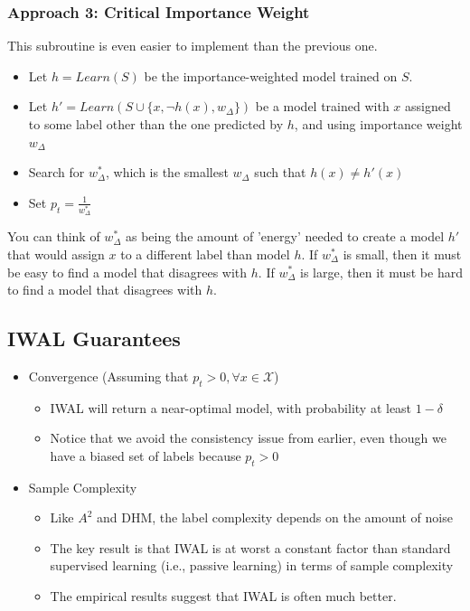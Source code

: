 \documentclass[10pt]{article}
\begin{document}
\subsubsection*{Approach 3: Critical Importance Weight}
This subroutine is even easier to implement than the previous one.
\begin{itemize}
	\item Let $h = Learn(S)$ be the importance-weighted model trained on $S$.
	\item Let $h' = Learn(S \cup \{x, \neg h(x), w_\Delta\})$ be a model trained with $x$ assigned to some label other than the one predicted by $h$, and using importance weight $w_{\Delta}$
	\item Search for $w_\Delta^*$, which is the smallest $w_\Delta$ such that $h(x) \neq h'(x)$
	\item Set $p_t = \frac{1}{w_\Delta^*}$
\end{itemize}
You can think of $w_\Delta^*$ as being the amount of 'energy' needed to create a model $h'$ that would assign $x$ to a different label than model $h$.  If $w_\Delta^*$ is small, then it must be easy to find a model that disagrees with $h$.  If $w_\Delta^*$ is large, then it must be hard to find a model that disagrees with $h$.

\subsection*{IWAL Guarantees}
\begin{itemize}
	\item Convergence (Assuming that $p_t > 0, \forall x \in \mathcal{X}$)
	\begin{itemize}
	    \item IWAL will return a near-optimal model, with probability at least $1 - \delta$
	    \item Notice that we avoid the consistency issue from earlier, even though we have a biased set of labels because $p_t > 0$
    \end{itemize}
	\item Sample Complexity
	\begin{itemize}
	    \item Like $A^2$ and DHM, the label complexity depends on the amount of noise
	    \item The key result is that IWAL is at worst a constant factor than standard supervised learning (i.e., passive learning) in terms of sample complexity
	    \item The empirical results suggest that IWAL is often much better.
    \end{itemize}
\end{itemize}
\end{document}
